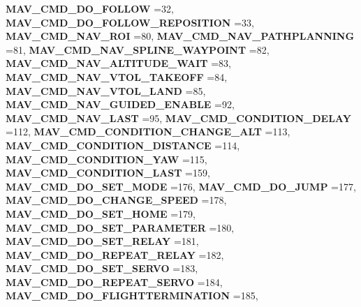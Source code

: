 \begin{DoxyCompactItemize}
\newline
\textbf{ M\+A\+V\+\_\+\+C\+M\+D\+\_\+\+D\+O\+\_\+\+F\+O\+L\+L\+OW} =32, 
\textbf{ M\+A\+V\+\_\+\+C\+M\+D\+\_\+\+D\+O\+\_\+\+F\+O\+L\+L\+O\+W\+\_\+\+R\+E\+P\+O\+S\+I\+T\+I\+ON} =33, 
\textbf{ M\+A\+V\+\_\+\+C\+M\+D\+\_\+\+N\+A\+V\+\_\+\+R\+OI} =80, 
\textbf{ M\+A\+V\+\_\+\+C\+M\+D\+\_\+\+N\+A\+V\+\_\+\+P\+A\+T\+H\+P\+L\+A\+N\+N\+I\+NG} =81, 
\newline
\textbf{ M\+A\+V\+\_\+\+C\+M\+D\+\_\+\+N\+A\+V\+\_\+\+S\+P\+L\+I\+N\+E\+\_\+\+W\+A\+Y\+P\+O\+I\+NT} =82, 
\textbf{ M\+A\+V\+\_\+\+C\+M\+D\+\_\+\+N\+A\+V\+\_\+\+A\+L\+T\+I\+T\+U\+D\+E\+\_\+\+W\+A\+IT} =83, 
\textbf{ M\+A\+V\+\_\+\+C\+M\+D\+\_\+\+N\+A\+V\+\_\+\+V\+T\+O\+L\+\_\+\+T\+A\+K\+E\+O\+FF} =84, 
\textbf{ M\+A\+V\+\_\+\+C\+M\+D\+\_\+\+N\+A\+V\+\_\+\+V\+T\+O\+L\+\_\+\+L\+A\+ND} =85, 
\newline
\textbf{ M\+A\+V\+\_\+\+C\+M\+D\+\_\+\+N\+A\+V\+\_\+\+G\+U\+I\+D\+E\+D\+\_\+\+E\+N\+A\+B\+LE} =92, 
\textbf{ M\+A\+V\+\_\+\+C\+M\+D\+\_\+\+N\+A\+V\+\_\+\+L\+A\+ST} =95, 
\textbf{ M\+A\+V\+\_\+\+C\+M\+D\+\_\+\+C\+O\+N\+D\+I\+T\+I\+O\+N\+\_\+\+D\+E\+L\+AY} =112, 
\textbf{ M\+A\+V\+\_\+\+C\+M\+D\+\_\+\+C\+O\+N\+D\+I\+T\+I\+O\+N\+\_\+\+C\+H\+A\+N\+G\+E\+\_\+\+A\+LT} =113, 
\newline
\textbf{ M\+A\+V\+\_\+\+C\+M\+D\+\_\+\+C\+O\+N\+D\+I\+T\+I\+O\+N\+\_\+\+D\+I\+S\+T\+A\+N\+CE} =114, 
\textbf{ M\+A\+V\+\_\+\+C\+M\+D\+\_\+\+C\+O\+N\+D\+I\+T\+I\+O\+N\+\_\+\+Y\+AW} =115, 
\textbf{ M\+A\+V\+\_\+\+C\+M\+D\+\_\+\+C\+O\+N\+D\+I\+T\+I\+O\+N\+\_\+\+L\+A\+ST} =159, 
\textbf{ M\+A\+V\+\_\+\+C\+M\+D\+\_\+\+D\+O\+\_\+\+S\+E\+T\+\_\+\+M\+O\+DE} =176, 
\newline
\textbf{ M\+A\+V\+\_\+\+C\+M\+D\+\_\+\+D\+O\+\_\+\+J\+U\+MP} =177, 
\textbf{ M\+A\+V\+\_\+\+C\+M\+D\+\_\+\+D\+O\+\_\+\+C\+H\+A\+N\+G\+E\+\_\+\+S\+P\+E\+ED} =178, 
\textbf{ M\+A\+V\+\_\+\+C\+M\+D\+\_\+\+D\+O\+\_\+\+S\+E\+T\+\_\+\+H\+O\+ME} =179, 
\textbf{ M\+A\+V\+\_\+\+C\+M\+D\+\_\+\+D\+O\+\_\+\+S\+E\+T\+\_\+\+P\+A\+R\+A\+M\+E\+T\+ER} =180, 
\newline
\textbf{ M\+A\+V\+\_\+\+C\+M\+D\+\_\+\+D\+O\+\_\+\+S\+E\+T\+\_\+\+R\+E\+L\+AY} =181, 
\textbf{ M\+A\+V\+\_\+\+C\+M\+D\+\_\+\+D\+O\+\_\+\+R\+E\+P\+E\+A\+T\+\_\+\+R\+E\+L\+AY} =182, 
\textbf{ M\+A\+V\+\_\+\+C\+M\+D\+\_\+\+D\+O\+\_\+\+S\+E\+T\+\_\+\+S\+E\+R\+VO} =183, 
\textbf{ M\+A\+V\+\_\+\+C\+M\+D\+\_\+\+D\+O\+\_\+\+R\+E\+P\+E\+A\+T\+\_\+\+S\+E\+R\+VO} =184, 
\newline
\textbf{ M\+A\+V\+\_\+\+C\+M\+D\+\_\+\+D\+O\+\_\+\+F\+L\+I\+G\+H\+T\+T\+E\+R\+M\+I\+N\+A\+T\+I\+ON} =185, 

\end{DoxyCompactItemize}

